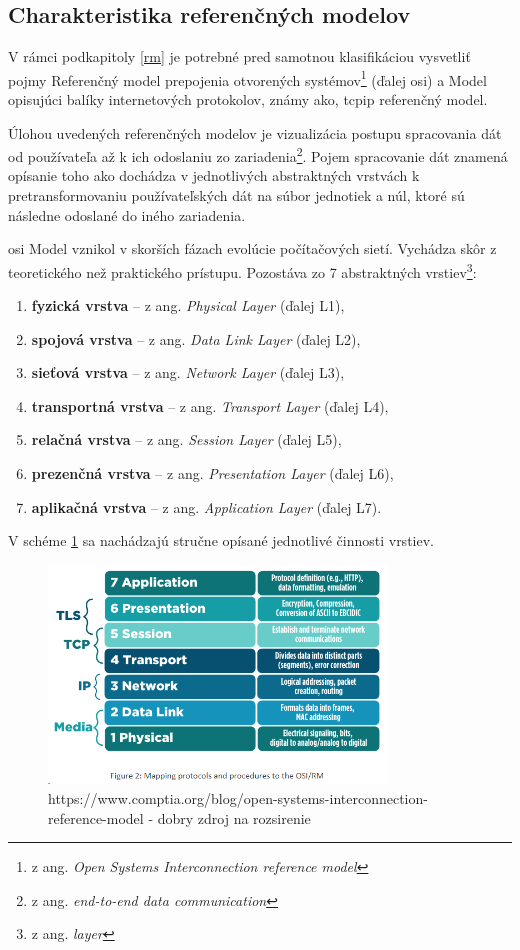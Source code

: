 \subsection{Charakteristika referenčných modelov}\label{crm}
V rámci  podkapitoly \ref{rm} je potrebné pred samotnou klasifikáciou vysvetliť pojmy Referenčný model prepojenia otvorených systémov\footnote{z ang. \textit{Open Systems Interconnection reference model}} (ďalej \acrshort{osi}) a Model opisujúci balíky internetových protokolov, známy ako, \acrshort{tcpip} referenčný model.

Úlohou uvedených referenčných modelov je vizualizácia postupu spracovania dát od používateľa až k ich odoslaniu zo zariadenia\footnote{z ang. \textit{end-to-end data communication}}. Pojem spracovanie dát znamená opísanie toho ako dochádza v jednotlivých abstraktných vrstvách k pretransformovaniu používateľských dát na súbor jednotiek a núl, ktoré sú následne odoslané do iného zariadenia. 

\acrshort{osi} Model vznikol v skorších fázach evolúcie počítačových sietí. Vychádza skôr z teoretického než praktického prístupu. Pozostáva zo 7 abstraktných vrstiev\footnote{z ang. \textit{layer}}:

\begin{enumerate}
	\item{\textbf{fyzická vrstva}} -- z ang. \textit{Physical Layer} (ďalej L1), 
	\item{\textbf{spojová vrstva}} -- z ang. \textit{Data Link Layer} (ďalej L2),
	\item{\textbf{sieťová vrstva}} -- z ang. \textit{Network Layer} (ďalej L3),
	\item{\textbf{transportná vrstva}} -- z ang. \textit{Transport Layer} (ďalej L4),
	\item{\textbf{relačná vrstva}} -- z ang. \textit{Session Layer} (ďalej L5),
	\item{\textbf{prezenčná vrstva}} -- z ang. \textit{Presentation Layer} (ďalej L6),
	\item{\textbf{aplikačná vrstva}} -- z ang. \textit{Application Layer} (ďalej L7).
\end{enumerate}

V schéme \ref{osi} sa nachádzajú stručne opísané jednotlivé činnosti vrstiev.
\begin{figure}[!h]
	\centering
	\includegraphics[width=0.8\textwidth]{figures/osi}
	\caption{https://www.comptia.org/blog/open-systems-interconnection-reference-model - dobry zdroj na rozsirenie}
	\label{osi}
\end{figure}


